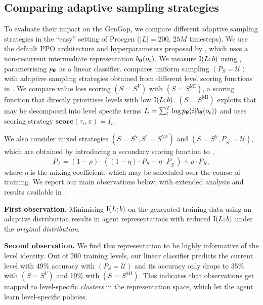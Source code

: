\documentclass{article}
\theoremstyle{plain}
\theoremstyle{definition}
\theoremstyle{remark}
\begin{document}
\subsection{Comparing adaptive sampling strategies} \label{sec:procgen_exp}
To evaluate their impact on the $\text{GenGap}$, we compare different adaptive sampling strategies in the ``easy'' setting of Procgen ($|L|=200$, $25M$ timesteps).  We use the default PPO \citep{PPO} architecture and hyperparameters proposed by \citet{procgen}, which uses a non-recurrent intermediate representation $b_{\bm{\theta}} (o_t)$. We measure $\text{I}(L;b)$ using , parametrising $p_{\bm{\theta}}$ as a linear classifier.
 compares uniform sampling $(P_S=\mathcal{U})$ with adaptive sampling strategies obtained from different level scoring functions in . We compare value loss scoring $(S=S^V)$ with $(S=S^{\text{MI}})$, a scoring function that directly prioritises levels with low $\text{I}(L;b)$. $(S=S^{\text{MI}})$ exploits that  may be decomposed into level specific terms $I_i = \sum_{t}^T \log p_{\bm{\theta}}(i|b_{\bm{\theta}}(o_t))$ and uses scoring strategy $\textbf{score}(\tau_i, \pi) = I_i$. 

We also consider mixed strategies $(S=S^V, S^\prime=S^{\text{MI}})$ and $(S=S^V, P_{S^\prime}=\mathcal{U})$, which are obtained by introducing a secondary scoring function to ,
\begin{equation} \label{eq:buffer_dist}
    P_\Lambda = (1 - \rho) \cdot ((1-\eta) \cdot  P_S + \eta \cdot P_{S^\prime}) + \rho \cdot P_R,
\end{equation}
where $\eta$ is the mixing coefficient, which may be scheduled over the course of training. We report our main observations below, with extended analysis and results available in .
    
    \textbf{First observation.} Minimising $\text{I}(L;b)$ on the generated training data using an adaptive distribution results in agent representations with reduced $\text{I}(L;b)$ under the \textit{original distribution}.
    
    \textbf{Second observation.} We find this representation to be highly informative of the level identity. Out of 200 training levels, our linear classifier predicts the current level with 49\% accuracy with $(P_S=\mathcal{U})$ and its accuracy only drops to 35\% with $(S=S^V)$ and 19\% with $(S=S^{\text{MI}})$. This indicates that observations get mapped to level-specific \textit{clusters} in the representation space, which let the agent learn level-specific policies.
    
\end{document}
